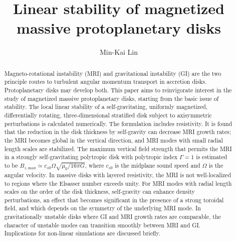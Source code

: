 \documentclass[iop]{emulateapj}
\newcommand{\csmid}{c_{s0}}
\begin{document}
\title{Linear stability of magnetized massive protoplanetary disks}


\author{Min-Kai Lin }%

\begin{abstract}
  Magneto-rotational instability (MRI) and gravitational instability
  (GI) are the two principle routes to turbulent angular momentum
  transport in accretion disks. Protoplanetary disks may develop 
  both. This paper aims to reinvigorate interest in the study of
  magnetized  massive protoplanetary disks, starting from the basic
  issue of stability. The local linear stability of a 
  self-gravitating, uniformly magnetized, differentially rotating, 
  three-dimensional stratified disk subject to axisymmetric perturbations is
  calculated numerically. The formulation includes 
  resistivity. It is found that the reduction in the disk thickness
  by self-gravity can decrease MRI growth rates; the MRI
  becomes global in the vertical direction, and MRI modes 
  with small radial length scales are stabilized. The
    maximum vertical field strength that permits the MRI
    in a strongly self-gravitating polytropic disk  with polytropic index $\Gamma=1$ 
    is estimated to be $B_{z,\mathrm{max}} \simeq \csmid\Omega\sqrt{\mu_0/16\pi G} $, where $\csmid$ is the midplane sound speed and $\Omega$ is the angular velocity. 
  In massive
  disks with layered resistivity, the MRI is not well-localized
  to regions where the Elsasser number exceeds unity. For MRI modes
  with radial length scales on the order of the disk thickness, self-gravity 
  can enhance density perturbations, an effect that becomes 
  significant in the presence of a strong toroidal field, and
    which depends on the symmetry of the underlying MRI mode. In
  gravitationally unstable disks where GI and MRI growth rates are
  comparable, the character of unstable modes can transition smoothly
  between MRI and GI. Implications for non-linear simulations are
  discussed briefly.   

%
\end{abstract}
\end{document}
